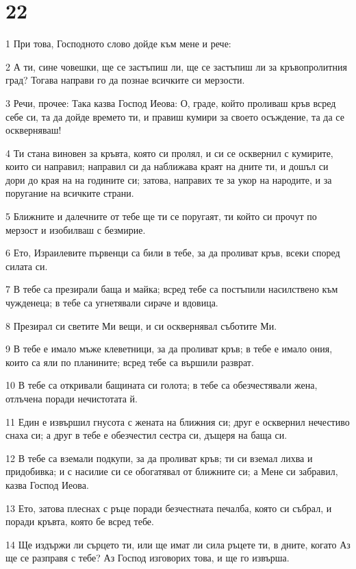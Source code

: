 \chapter{22}

\par 1 При това, Господното слово дойде към мене и рече:
\par 2 А ти, сине човешки, ще се застъпиш ли, ще се застъпиш ли за кръвопролитния град? Тогава направи го да познае всичките си мерзости.
\par 3 Речи, прочее: Така казва Господ Иеова: О, граде, който проливаш кръв всред себе си, та да дойде времето ти, и правиш кумири за своето осъждение, та да се оскверняваш!
\par 4 Ти стана виновен за кръвта, която си пролял, и си се осквернил с кумирите, които си направил; направил си да наближава краят на дните ти, и дошъл си дори до края на на годините си; затова, направих те за укор на народите, и за поругание на всичките страни.
\par 5 Ближните и далечните от тебе ще ти се поругаят, ти който си прочут по мерзост и изобилваш с безмирие.
\par 6 Ето, Израилевите първенци са били в тебе, за да проливат кръв, всеки според силата си.
\par 7 В тебе са презирали баща и майка; всред тебе са постъпили насилствено към чужденеца; в тебе са угнетявали сираче и вдовица.
\par 8 Презирал си светите Ми вещи, и си осквернявал съботите Ми.
\par 9 В тебе е имало мъже клеветници, за да проливат кръв; в тебе е имало ония, които са яли по планините; всред тебе са вършили разврат.
\par 10 В тебе са откривали бащината си голота; в тебе са обезчестявали жена, отлъчена поради нечистотата й.
\par 11 Един е извършил гнусота с жената на ближния си; друг е осквернил нечестиво снаха си; а друг в тебе е обезчестил сестра си, дъщеря на баща си.
\par 12 В тебе са вземали подкупи, за да проливат кръв; ти си вземал лихва и придобивка; и с насилие си се обогатявал от ближните си; а Мене си забравил, казва Господ Иеова.
\par 13 Ето, затова плеснах с ръце поради безчестната печалба, която си събрал, и поради кръвта, която бе всред тебе.
\par 14 Ще издържи ли сърцето ти, или ще имат ли сила ръцете ти, в дните, когато Аз ще се разправя с тебе? Аз Господ изговорих това, и ще го извърша.
